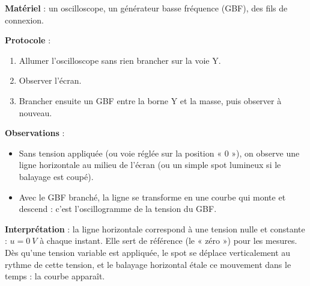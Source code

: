 \documentclass[11pt]{article}
\newcommand{\cle}[1]{{\popxbold\color{popdark}#1}}
\begin{document}
\begin{experience}
\textbf{Matériel} : un oscilloscope, un générateur basse fréquence (GBF), des fils de connexion.

\textbf{Protocole} :
\begin{enumerate}
\item Allumer l'oscilloscope sans rien brancher sur la voie Y.
\item Observer l'écran.
\item Brancher ensuite un GBF entre la borne Y et la masse, puis observer à nouveau.
\end{enumerate}

\textbf{Observations} :
\begin{itemize}
\item Sans tension appliquée (ou voie réglée sur la position « 0 »), on observe une \cle{ligne horizontale} au milieu de l'écran (ou un simple \cle{spot} lumineux si le balayage est coupé).
\item Avec le GBF branché, la ligne se transforme en une courbe qui monte et descend : c'est l'oscillogramme de la tension du GBF.
\end{itemize}

\textbf{Interprétation} : la ligne horizontale correspond à une tension nulle et constante : $u = \SI{0}{V}$ à chaque instant. Elle sert de \cle{référence} (le « zéro ») pour les mesures. Dès qu'une tension variable est appliquée, le spot se déplace verticalement au rythme de cette tension, et le balayage horizontal étale ce mouvement dans le temps : la courbe apparaît.
\end{experience}
\end{document}

